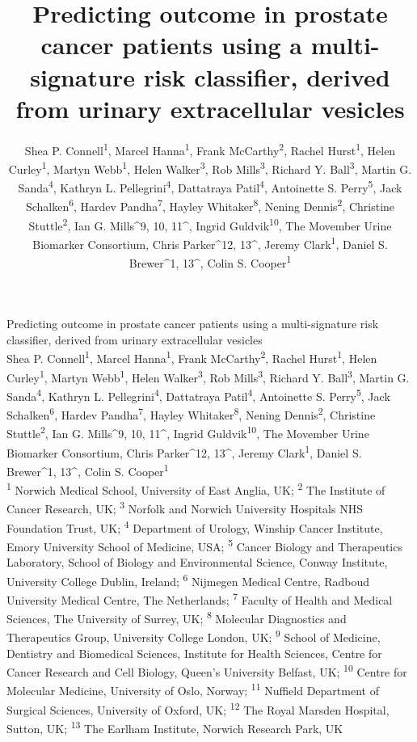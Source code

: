 \documentclass[article,30pt,extrafontsizes]{memoir}
\author{Shea P. Connell\textsuperscript{1}, Marcel Hanna\textsuperscript{1},
Frank McCarthy\textsuperscript{2}, Rachel Hurst\textsuperscript{1},
Helen Curley\textsuperscript{1}, Martyn Webb\textsuperscript{1}, Helen
Walker\textsuperscript{3}, Rob Mills\textsuperscript{3}, Richard Y.
Ball\textsuperscript{3}, Martin G. Sanda\textsuperscript{4}, Kathryn L.
Pellegrini\textsuperscript{4}, Dattatraya Patil\textsuperscript{4},
Antoinette S. Perry\textsuperscript{5}, Jack
Schalken\textsuperscript{6}, Hardev Pandha\textsuperscript{7}, Hayley
Whitaker\textsuperscript{8}, Nening Dennis\textsuperscript{2}, Christine
Stuttle\textsuperscript{2}, Ian G. Mills\^{}9, 10, 11\^{}, Ingrid
Guldvik\textsuperscript{10}, The Movember Urine Biomarker Consortium,
Chris Parker\^{}12, 13\^{}, Jeremy Clark\textsuperscript{1}, Daniel S.
Brewer\^{}1, 13\^{}, Colin S. Cooper\textsuperscript{1}}
\title{\fontfamily{phv}\selectfont Predicting outcome in prostate cancer
patients using a multi-signature risk classifier, derived from urinary
extracellular vesicles}
\begin{document}
\begin{flushleft}
\begin{mdframed}[style=brentsmdfstyle]

\renewcommand\footnoterule{}
\renewcommand{\thempfootnote}{\footnotesize\color{footnotetextcol}{\arabic{mpfootnote}}}

\begingroup
  \centering
  \color{titletextcol}
\vspace{0.5in}
  \Huge{\selectfont Predicting outcome in prostate cancer
patients using a multi-signature risk classifier, derived from urinary
extracellular vesicles}  \\[0.3in]
  \color{authortextcol} \normalsize{Shea P. Connell\textsuperscript{1}, Marcel Hanna\textsuperscript{1},
Frank McCarthy\textsuperscript{2}, Rachel Hurst\textsuperscript{1},
Helen Curley\textsuperscript{1}, Martyn Webb\textsuperscript{1}, Helen
Walker\textsuperscript{3}, Rob Mills\textsuperscript{3}, Richard Y.
Ball\textsuperscript{3}, Martin G. Sanda\textsuperscript{4}, Kathryn L.
Pellegrini\textsuperscript{4}, Dattatraya Patil\textsuperscript{4},
Antoinette S. Perry\textsuperscript{5}, Jack
Schalken\textsuperscript{6}, Hardev Pandha\textsuperscript{7}, Hayley
Whitaker\textsuperscript{8}, Nening Dennis\textsuperscript{2}, Christine
Stuttle\textsuperscript{2}, Ian G. Mills\^{}9, 10, 11\^{}, Ingrid
Guldvik\textsuperscript{10}, The Movember Urine Biomarker Consortium,
Chris Parker\^{}12, 13\^{}, Jeremy Clark\textsuperscript{1}, Daniel S.
Brewer\^{}1, 13\^{}, Colin S. Cooper\textsuperscript{1}} \\[0.2in]
  \color{affiliationtextcol} \footnotesize{\textsuperscript{1} Norwich Medical School, University of East Anglia,
UK; \textsuperscript{2} The Institute of Cancer Research, UK;
\textsuperscript{3} Norfolk and Norwich University Hospitals NHS
Foundation Trust, UK; \textsuperscript{4} Department of Urology, Winship
Cancer Institute, Emory University School of Medicine, USA;
\textsuperscript{5} Cancer Biology and Therapeutics Laboratory, School
of Biology and Environmental Science, Conway Institute, University
College Dublin, Ireland; \textsuperscript{6} Nijmegen Medical Centre,
Radboud University Medical Centre, The Netherlands; \textsuperscript{7}
Faculty of Health and Medical Sciences, The University of Surrey, UK;
\textsuperscript{8} Molecular Diagnostics and Therapeutics Group,
University College London, UK; \textsuperscript{9} School of Medicine,
Dentistry and Biomedical Sciences, Institute for Health Sciences, Centre
for Cancer Research and Cell Biology, Queen's University Belfast, UK;
\textsuperscript{10} Centre for Molecular Medicine, University of Oslo,
Norway; \textsuperscript{11} Nuffield Department of Surgical Sciences,
University of Oxford, UK; \textsuperscript{12} The Royal Marsden
Hospital, Sutton, UK; \textsuperscript{13} The Earlham Institute,
Norwich Research Park, UK}
  \vspace{0.2in}


\end{mdframed}
\end{flushleft}
\end{document}
